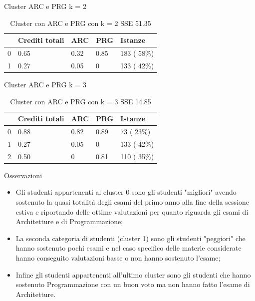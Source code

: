 \documentclass{beamer}
\begin{document}
\begin{frame}{Cluster ARC e PRG k = 2}
  \begin{table}[ht]
    \centering
    \begin{tabular}{@{}lllll@{}}
    \toprule
      & Crediti totali & ARC  & PRG  & Istanze\\ \midrule
    0 & 0.65           & 0.32 & 0.85 & 183 ( 58\%)\\
    1 & 0.27           & 0.05 & 0    & 133 ( 42\%)\\ \bottomrule
    \end{tabular}
    \caption{Cluster con ARC e PRG con k = 2 SSE 51.35}
    \label{c2AP}
  \end{table}
\end{frame}

\begin{frame}{Cluster ARC e PRG k = 3}
  \begin{table}[ht]
    \centering
    \begin{tabular}{@{}lllll@{}}
    \toprule
      & Crediti totali & ARC  & PRG  & Istanze\\ \midrule
    0 & 0.88           & 0.82 & 0.89 & 73 ( 23\%)\\
    1 & 0.27           & 0.05 & 0    & 133 ( 42\%)\\
    2 & 0.50           & 0    & 0.81 & 110 ( 35\%)\\ \bottomrule
    \end{tabular}
    \caption{Cluster con ARC e PRG con k = 3 SSE 14.85}
    \label{c3AP}
  \end{table}
\end{frame}

\begin{frame}{Osservazioni}
  \begin{itemize}
    \item Gli studenti appartenenti al cluster 0 sono gli studenti "migliori" a\-vendo sostenuto la quasi totalità degli esami del primo anno alla fine della sessione estiva e riportando delle ottime valutazioni per quanto riguarda gli esami di Architetture e di Programmazione;
    \item La seconda categoria di studenti (cluster 1) sono gli studenti "peg\-giori" che hanno sostenuto pochi esami e nel caso specifico delle materie considerate hanno conseguito valutazioni basse o non hanno sostenuto l'esame;
    \item Infine gli studenti appartenenti all'ultimo cluster sono gli studenti che hanno sostenuto Programmazione con un buon voto ma non hanno fatto l'esame di Architetture.
  \end{itemize}
\end{frame}
\end{document}
